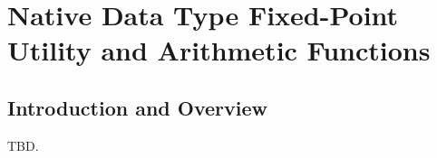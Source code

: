 \chapter{Native Data Type Fixed-Point Utility and Arithmetic Functions}
\label{cfpa0}

\section{Introduction and Overview}
\label{cfpa0:siov0}

TBD.


